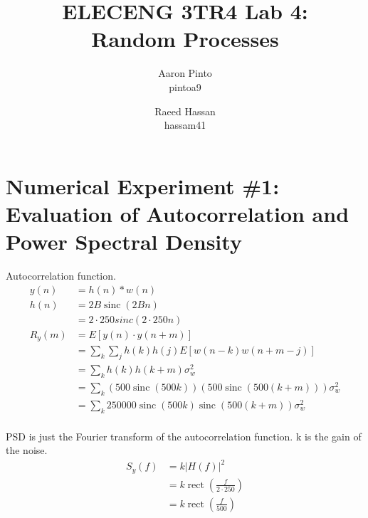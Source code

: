 \documentclass[12pt]{article}
\title{ELECENG 3TR4 Lab 4: \\ Random Processes}
\author{
    Aaron Pinto \\ pintoa9
    \and
    Raeed Hassan \\ hassam41
}
\DeclareMathOperator{\sinc}{sinc}
\DeclareMathOperator{\rect}{rect}
\begin{document}
\maketitle
\clearpage

\section*{Numerical Experiment \#1: Evaluation of Autocorrelation and Power Spectral Density}

Autocorrelation function.
\begin{equation*}
\begin{aligned}
        y(n) &= h(n)\ast w(n) \\
        h(n) &= 2B\sinc(2Bn) \\
        &= 2\cdot 250sinc(2\cdot 250 n) \\
	R_y(m) &= E\left[y(n)\cdot y(n+m)\right] \\
        &= \sum_k\sum_j h(k)h(j)E[w(n-k)w(n+m-j)] \\
	&= \sum_k h(k)h(k+m)\sigma_w^2 \\
        &= \sum_k (500\sinc(500k))(500\sinc(500(k+m)))\sigma_w^2 \\
        &= \sum_k 250000\sinc(500k)\sinc(500(k+m))\sigma_w^2 \\
\end{aligned}
\end{equation*}

PSD is just the Fourier transform of the autocorrelation function. k is the gain of the noise.
\begin{equation*}
\begin{aligned}
        S_y(f) &= k \left | H(f) \right |^2 \\
        &= k \rect(\frac{f}{2\cdot 250}) \\
        &= k \rect(\frac{f}{500}) \\
\end{aligned}
\end{equation*}

\end{document}
